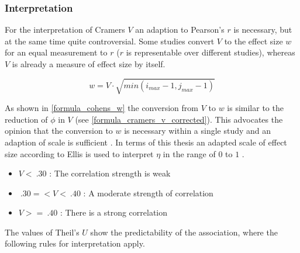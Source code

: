 
\subsubsection{Interpretation}
For the interpretation of Cramers $V$ an adaption to Pearson's $r$ is necessary, but at the same time quite controversial. Some studies convert $V$ to the effect size $w$ for an equal measurement to $r$ ($r$ is representable over different studies), whereas $V$ is already a measure of effect size by itself. \parencite{Baguley2016}

\smallskip
\begin{equation}
\label{formula_cohens_w}
	w = V \cdot \sqrt{min(i_{max}-1,j_{max}-1)}
\end{equation}

\medskip

As shown in \cref{formula_cohens_w} \parencite{Baguley2016} the conversion from $V$ to $w$ is similar to the reduction of $\phi$ in $V$ (see \cref{formula_cramers_v_corrected}). This advocates the opinion that the conversion to $w$ is necessary within a single study and an adaption of scale is sufficient \parencite{Baguley2016}. In terms of this thesis an adapted scale of effect size according to Ellis is used to interpret $\eta$ in the range of $0$ to $1$ \parencite{Cohen1988,Ellis2010,Hemmerich2019}.

\begin{itemize}
	\item $V < \: .30$ : The correlation strength is weak
	\item $\: .30 =< V < \: .40$ : A moderate strength of correlation
	\item $V >= \: .40$ : There is a strong correlation
\end{itemize}

The values of Theil's $U$ show the predictability of the association, where the following rules for interpretation apply. \parencite{TheilsInt01,TheilsInt02,TheilsInt03}

